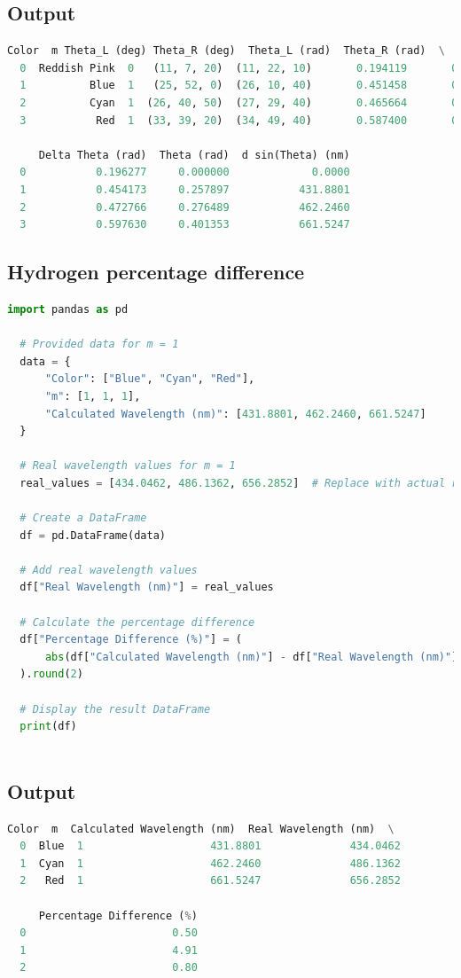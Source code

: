 \documentclass[a4paper,11pt]{article}
\begin{document}
\subsection*{Output}
\begin{lstlisting}[language=Python]
  Color  m Theta_L (deg) Theta_R (deg)  Theta_L (rad)  Theta_R (rad)  \
  0  Reddish Pink  0   (11, 7, 20)  (11, 22, 10)       0.194119       0.198434   
  1          Blue  1   (25, 52, 0)  (26, 10, 40)       0.451458       0.456888   
  2          Cyan  1  (26, 40, 50)  (27, 29, 40)       0.465664       0.479869   
  3           Red  1  (33, 39, 20)  (34, 49, 40)       0.587400       0.607859   
  
     Delta Theta (rad)  Theta (rad)  d sin(Theta) (nm)  
  0           0.196277     0.000000             0.0000  
  1           0.454173     0.257897           431.8801  
  2           0.472766     0.276489           462.2460  
  3           0.597630     0.401353           661.5247
\end{lstlisting}

\newpage
%
\subsection*{Hydrogen percentage difference}
\begin{lstlisting}[language=Python]
  import pandas as pd

  # Provided data for m = 1
  data = {
      "Color": ["Blue", "Cyan", "Red"],
      "m": [1, 1, 1],
      "Calculated Wavelength (nm)": [431.8801, 462.2460, 661.5247]
  }
  
  # Real wavelength values for m = 1
  real_values = [434.0462, 486.1362, 656.2852]  # Replace with actual real values
  
  # Create a DataFrame
  df = pd.DataFrame(data)
  
  # Add real wavelength values
  df["Real Wavelength (nm)"] = real_values
  
  # Calculate the percentage difference
  df["Percentage Difference (%)"] = (
      abs(df["Calculated Wavelength (nm)"] - df["Real Wavelength (nm)"]) / df["Real Wavelength (nm)"] * 100
  ).round(2)
  
  # Display the result DataFrame
  print(df)
  
\end{lstlisting}
\subsection*{Output}
\begin{lstlisting}[language=Python]
  Color  m  Calculated Wavelength (nm)  Real Wavelength (nm)  \
  0  Blue  1                    431.8801              434.0462   
  1  Cyan  1                    462.2460              486.1362   
  2   Red  1                    661.5247              656.2852   
  
     Percentage Difference (%)  
  0                       0.50  
  1                       4.91  
  2                       0.80
\end{lstlisting}
\end{document}
